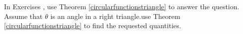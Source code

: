 {\noindent In Exercises}
{, use Theorem \ref{circularfunctionstriangle}  to answer the question.  Assume that $\theta$ is an angle in a right triangle.use Theorem \ref{circularfunctionstriangle} to find the requested quantities.}
